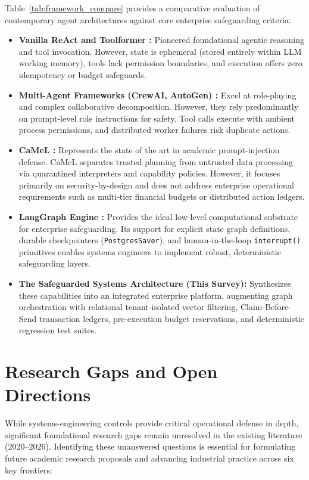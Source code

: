 \documentclass[10pt,a4paper,twocolumn]{article}
\begin{document}
Table~\ref{tab:framework_compare} provides a comparative evaluation of contemporary agent architectures against core enterprise safeguarding criteria:
\begin{itemize}[leftmargin=*]
  \item \textbf{Vanilla ReAct and Toolformer \cite{yao2023react,schick2023toolformer}:} Pioneered foundational agentic reasoning and tool invocation. However, state is ephemeral (stored entirely within LLM working memory), tools lack permission boundaries, and execution offers zero idempotency or budget safeguards.
  \item \textbf{Multi-Agent Frameworks (CrewAI, AutoGen) \cite{wang2024agents}:} Excel at role-playing and complex collaborative decomposition. However, they rely predominantly on prompt-level role instructions for safety. Tool calls execute with ambient process permissions, and distributed worker failures risk duplicate actions.
  \item \textbf{CaMeL \cite{debenedetti2025camel}:} Represents the state of the art in academic prompt-injection defense. CaMeL separates trusted planning from untrusted data processing via quarantined interpreters and capability policies. However, it focuses primarily on security-by-design and does not address enterprise operational requirements such as multi-tier financial budgets or distributed action ledgers.
  \item \textbf{LangGraph Engine \cite{anthropic2024effective}:} Provides the ideal low-level computational substrate for enterprise safeguarding. Its support for explicit state graph definitions, durable checkpointers (\texttt{PostgresSaver}), and human-in-the-loop \texttt{interrupt()} primitives enables systems engineers to implement robust, deterministic safeguarding layers.
  \item \textbf{The Safeguarded Systems Architecture (This Survey):} Synthesizes these capabilities into an integrated enterprise platform, augmenting graph orchestration with relational tenant-isolated vector filtering, Claim-Before-Send transaction ledgers, pre-execution budget reservations, and deterministic regression test suites.
\end{itemize}

\section{Research Gaps and Open Directions}
\label{sec:open}

While systems-engineering controls provide critical operational defense in depth, significant foundational research gaps remain unresolved in the existing literature (2020--2026). Identifying these unanswered questions is essential for formulating future academic research proposals and advancing industrial practice across six key frontiers:
\end{document}

